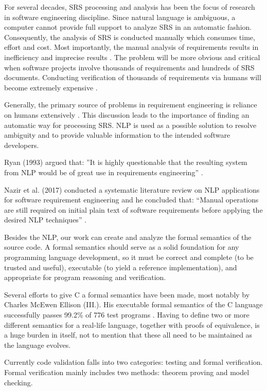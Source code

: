 \begin{multicols*}{2}
	For several decades, \gls{SRS} processing and analysis has been the focus of research in software engineering discipline. Since natural language is ambiguous, a computer cannot provide full support to analyze \gls{SRS} in an automatic fashion. Consequently, the analysis of \gls{SRS} is conducted manually which consumes time, effort and cost. Most importantly, the manual analysis of requirements results in inefficiency and imprecise results \cite{Wang}. The problem will be more obvious and critical when software projects involve thousands of requirements and hundreds of \gls{SRS} documents. Conducting verification of thousands of requirements via humans will become extremely expensive \cite{Fanmuy}.
	
	Generally, the primary source of problems in requirement engineering is reliance on humans extensively \cite{Ahmed}. This discussion leads to the importance of finding an automatic way for processing \gls{SRS}. \gls{NLP} is used as a possible solution to resolve ambiguity and to provide valuable information to the intended software developers.
	
	Ryan (1993) argued that: ”It is highly questionable that the resulting system from \gls{NLP} would be of great use in requirements engineering” \cite{Ryan}.
	
	Nazir et al. (2017) conducted a systematic literature review on \gls{NLP} applications for software requirement engineering and he concluded that: “Manual operations are still required on initial plain text of software requirements before applying the desired \gls{NLP} techniques” \cite{Nazir}.
	
	Besides the \gls{NLP}, our work can create and analyze the formal semantics of the source code.  A formal semantics should serve as a solid foundation for any programming language development, so it must be correct and complete (to be trusted and useful), executable (to yield a reference implementation), and appropriate for program reasoning and verification.
	
	Several efforts to give C a formal semantics have been made, most notably by Charles McEwen Ellison (III.). His executable formal semantics of the C language successfully passes  99.2\% of 776 test programs \cite{Ellison:2012:EFS:2103621.2103719}. Having to define two or more different semantics for a real-life language, together with proofs of equivalence, is a huge burden in itself, not to mention that these all need to be maintained as the language evolves.
	
	Currently code validation falls into two categories: testing and formal verification. Formal verification mainly includes two methods: theorem proving and model checking.
	

\end{multicols*}
